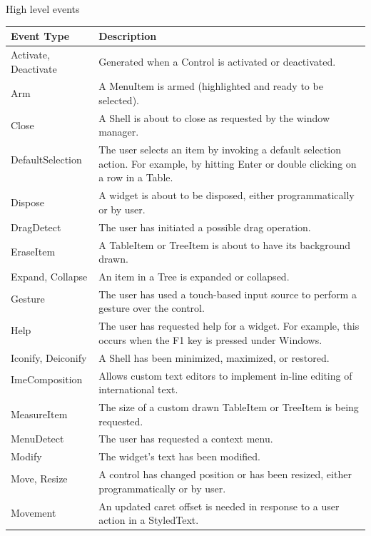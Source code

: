 \begin{center}
High level events
\begin{tabular}{l|l}
Event Type & Description\\
\hline
Activate, Deactivate & Generated when a Control is activated or deactivated.\\
Arm & A MenuItem is armed (highlighted and ready to be selected).\\
Close & A Shell is about to close as requested by the window manager.\\
DefaultSelection & \multirow{2}{*}{\parbox{12cm}{The user selects an item by invoking a default selection action. For example, by hitting Enter or double clicking on a row in a Table.}}\\
&\\
Dispose & A widget is about to be disposed, either programmatically or by user.\\
DragDetect & The user has initiated a possible drag operation.\\
EraseItem & A TableItem or TreeItem is about to have its background drawn.\\
Expand, Collapse & An item in a Tree is expanded or collapsed.\\
Gesture & \multirow{2}{*}{\parbox{12cm}{The user has used a touch-based input source to perform a gesture over the control.}}\\
&\\
Help & \multirow{2}{*}{\parbox{12cm}{The user has requested help for a widget. For example, this occurs when the F1 key is pressed under Windows.}}\\
&\\
Iconify, Deiconify & A Shell has been minimized, maximized, or restored.\\
ImeComposition & \multirow{2}{*}{\parbox{12cm}{Allows custom text editors to implement in-line editing of international text.}}\\
&\\
MeasureItem & The size of a custom drawn TableItem or TreeItem is being requested.\\
MenuDetect & The user has requested a context menu.\\
Modify & The widget's text has been modified.\\
Move, Resize & \multirow{2}{*}{\parbox{12cm}{A control has changed position or has been resized, either programmatically or by user.}}\\
&\\
Movement & \multirow{2}{*}{\parbox{12cm}{An updated caret offset is needed in response to a user action in a StyledText.}}\\

\end{tabular}
\end{center}
